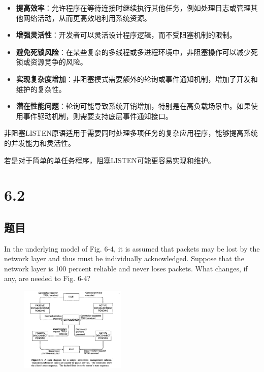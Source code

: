 \documentclass[14pt,a4paper,UTF8,twoside]{article}
\begin{document}
\begin{prp}{}{}
\begin{itemize}
    \item \textbf{提高效率}：允许程序在等待连接时继续执行其他任务，例如处理日志或管理其他网络活动，从而更高效地利用系统资源。
    \item \textbf{增强灵活性}：开发者可以灵活设计程序逻辑，而不受阻塞机制的限制。
    \item \textbf{避免死锁风险}：在某些复杂的多线程或多进程环境中，非阻塞操作可以减少死锁或资源竞争的风险。
\end{itemize}
\end{prp}

\begin{thm}{}{}
\begin{itemize}
    \item \textbf{实现复杂度增加}：非阻塞模式需要额外的轮询或事件通知机制，增加了开发和维护的复杂性。
    \item \textbf{潜在性能问题}：轮询可能导致系统开销增加，特别是在高负载场景中。如果使用事件驱动机制，则需要支持底层事件通知接口。
\end{itemize}
\end{thm}

非阻塞LISTEN原语适用于需要同时处理多项任务的复杂应用程序，能够提高系统的并发能力和灵活性。

若是对于简单的单任务程序，阻塞LISTEN可能更容易实现和维护。

\section{6.2}

\subsection*{题目}

In the underlying model of Fig. 6-4, it is assumed that packets may be lost by the network layer and thus must be individually acknowledged. Suppose that the network layer is 100 percent reliable and never loses packets. What changes, if any, are needed to Fig. 6-4?

\begin{figure}[H]
    \centering
    \includegraphics[width=0.45\textwidth]{lec6/6-4.png}
    \label{fig:6-4}
\end{figure}
\end{document}
